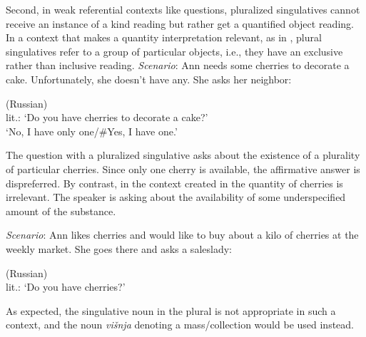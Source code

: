 \documentclass[output=paper,colorlinks,citecolor=brown,
]{langscibook}
\begin{document}
\noindent Second, in weak referential contexts like questions, pluralized singulatives cannot receive an instance of a kind reading but rather get a quantified object reading. In a context that makes a quantity interpretation relevant, as in , plural singulatives refer to a group of particular objects, i.e., they have an exclusive rather than inclusive reading. 
\eanoraggedright\label{ex:28} \textit{Scenario}: Ann needs some cherries to decorate a cake. Unfortunately, she doesn't have any. She asks her neighbor:
\begin{xlist}
\hfill (Russian) \\
lit.: `Do you have cherries to decorate a cake?'\label{ex:28A:} 
 \\ 
`No, I have only one/\#Yes, I have one.'\label{ex:28B:}
\end{xlist}
\z

\noindent The question with a pluralized singulative asks about the existence of a plurality of particular cherries. Since only one cherry is available, the affirmative answer is dispreferred. By contrast, in the context created in  the quantity of cherries is irrelevant. The speaker is asking about the availability of some underspecified amount of the substance. 

\eanoraggedright\label{ex:29} \textit{Scenario}: Ann likes cherries and would like to buy about a kilo of cherries at the weekly market. She goes there and asks a saleslady:
\begin{xlist}
\hfill (Russian) \\
lit.: `Do you have cherries?'
\end{xlist}
\z

\noindent As expected, the singulative noun in the plural is not appropriate in such a context, and the noun \textit{višnja} denoting a mass/collection would be used instead. 
\end{document}
